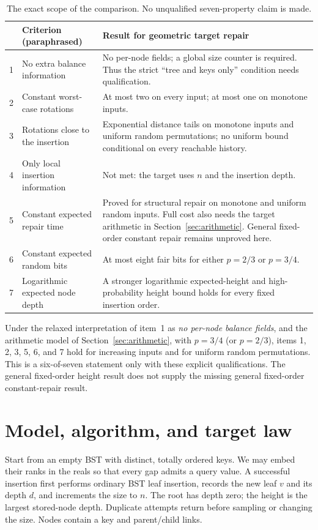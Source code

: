 \documentclass[11pt]{article}
\begin{document}
\begin{table}[htbp]
\centering\small
\renewcommand{\arraystretch}{1.16}
\begin{tabular}{@{}p{.04\linewidth}>{\raggedright\arraybackslash}p{.31\linewidth}>{\raggedright\arraybackslash}p{.58\linewidth}@{}}
\toprule
 & Criterion (paraphrased) & Result for geometric target repair \\
\midrule
1 & No extra balance information & No per-node fields; a global size counter is required. Thus the strict ``tree and keys only'' condition needs qualification. \\
2 & Constant worst-case rotations & At most two on every input; at most one on monotone inputs. \\
3 & Rotations close to the insertion & Exponential distance tails on monotone inputs and uniform random permutations; no uniform bound conditional on every reachable history. \\
4 & Only local insertion information & Not met: the target uses $n$ and the insertion depth. \\
5 & Constant expected repair time & Proved for structural repair on monotone and uniform random inputs. Full cost also needs the target arithmetic in Section~\ref{sec:arithmetic}. General fixed-order constant repair remains unproved here. \\
6 & Constant expected random bits & At most eight fair bits for either $p=2/3$ or $p=3/4$. \\
7 & Logarithmic expected node depth & A stronger logarithmic expected-height and high-probability height bound holds for every fixed insertion order. \\
\bottomrule
\end{tabular}
\caption{The exact scope of the comparison. No unqualified seven-property claim is made.}
\label{tab:criteria}
\end{table}

\begin{samepage}
Under the relaxed interpretation of item~1 as \emph{no per-node balance fields},
and the arithmetic model of Section~\ref{sec:arithmetic}, with $p=3/4$
(or $p=2/3$), items 1, 2, 3, 5, 6,
and 7 hold for increasing inputs and for uniform random permutations.
This is a six-of-seven statement only with these explicit qualifications.
The general fixed-order height result does not supply the missing general
fixed-order constant-repair result.
\end{samepage}

\section{Model, algorithm, and target law}\label{sec:model}
Start from an empty BST with distinct, totally ordered keys. We may embed their
ranks in the reals so that every gap admits a query value. A successful
insertion first performs ordinary BST leaf insertion, records the new leaf $v$
and its depth $d$, and increments the size to $n$. The root has depth zero;
the height is the largest stored-node depth. Duplicate attempts return before
sampling or changing the size. Nodes contain a key and parent/child links.
\end{document}
